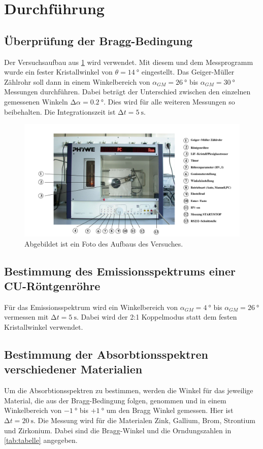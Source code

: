 \section{Durchführung}
\label{sec:Durchführung}

\subsection{Überprüfung der Bragg-Bedingung}
Der Versuchsaufbau aus \ref{fig:Aufbau} wird verwendet.
Mit diesem und dem Messprogramm wurde ein fester Kristallwinkel von $\theta = \qty{14}{\degree}$ eingestellt.
Das Geiger-Müller Zählrohr soll dann in einem Winkelbereich von $\alpha_{GM}=\qty{26}{\degree}$ bis $\alpha_{GM}=\qty{30}{\degree}$ Messungen durchführen.
Dabei beträgt der Unterschied zwischen den einzelnen gemessenen Winkeln $\increment \alpha = \qty{0.2}{\degree}$.
Dies wird für alle weiteren Messungen so beibehalten.
Die Integrationszeit ist $\increment t=\qty{5}{\second}$.

\begin{figure}[H]
    \centering
    \includegraphics[width=\textwidth]{Bilder/Aufbau.png}
    \caption{Abgebildet ist ein Foto des Aufbaus des Versuches.}
    \label{fig:Aufbau}
\end{figure}

\subsection{Bestimmung des Emissionsspektrums einer CU-Röntgenröhre}
Für das Emissionsspektrum wird ein Winkelbereich von $\alpha_{GM}=\qty{4}{\degree}$ bis $\alpha_{GM}=\qty{26}{\degree}$ vermessen mit $\increment t=\qty{5}{\second}$.
Dabei wird der 2:1 Koppelmodus statt dem festen Kristallwinkel verwendet.

\subsection{Bestimmung der Absorbtionsspektren verschiedener Materialien}
Um die Absorbtionsspektren zu bestimmen, werden die Winkel für das jeweilige Material, die aus der Bragg-Bedingung folgen, genommen und in einem Winkelbereich von 
$\qty{-1}{\degree}$ bis $+ \qty{1}{\degree}$ um den Bragg Winkel gemessen.
Hier ist $\increment t=\qty{20}{\second}$.
Die Messung wird für die Materialen Zink, Gallium, Brom, Strontium und Zirkonium.
Dabei sind die Bragg-Winkel und die Orndungszahlen in \ref{tab:tabelle} angegeben.

